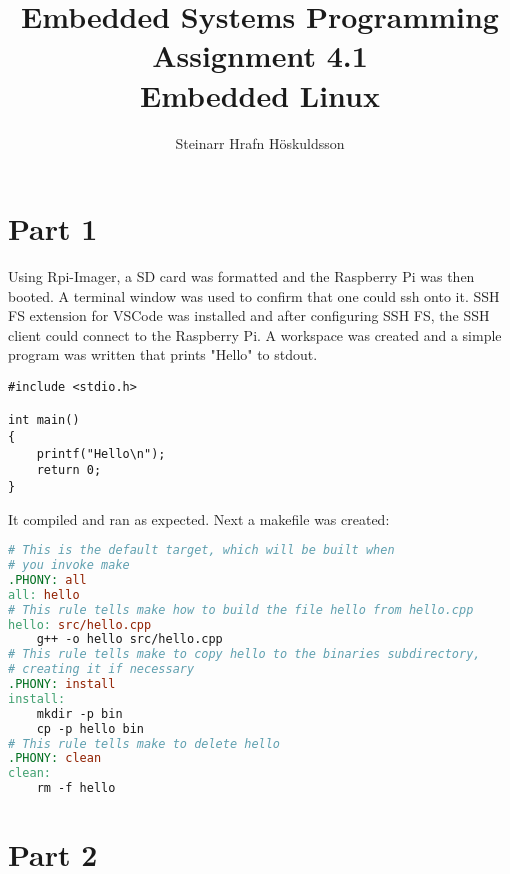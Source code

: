 \documentclass{article}
\title{Embedded Systems Programming \\ Assignment 4.1 \\ \large Embedded Linux}
\author{Steinarr Hrafn Höskuldsson}
\newcommand{\mycomment}[1]{}
\begin{document}
\pagestyle{firststyle}
{\let\newpage\relax\maketitle}

\mycomment{
\begin{figure}[h]
    \centering
    \texttt{[image: LAB3/Basic1.png]}
    \caption{"Switch test" Breadboard set up}
    \label{fig:Switch_test}
\end{figure}



}

\section*{Part 1}

Using Rpi-Imager, a SD card was formatted and the Raspberry Pi was then booted. A terminal window was used to confirm that one could ssh onto it. SSH FS extension for VSCode was installed and after configuring SSH FS, the SSH client could connect to the Raspberry Pi. A workspace was created and a simple program was written that prints "Hello" to stdout.

\begin{lstlisting}[caption={src/hello.cpp, writes "Hello" to stdout}]
#include <stdio.h>

int main()
{
    printf("Hello\n");
    return 0;
}
\end{lstlisting}

It compiled and ran as expected. Next a makefile was created:

\begin{lstlisting}[language=makefile, caption={Makefile for simple hello program}]
# This is the default target, which will be built when 
# you invoke make
.PHONY: all
all: hello
# This rule tells make how to build the file hello from hello.cpp
hello: src/hello.cpp
	g++ -o hello src/hello.cpp
# This rule tells make to copy hello to the binaries subdirectory,
# creating it if necessary
.PHONY: install
install:
	mkdir -p bin
	cp -p hello bin
# This rule tells make to delete hello 
.PHONY: clean 
clean:
	rm -f hello

\end{lstlisting}
\section*{Part 2}
\end{document}

